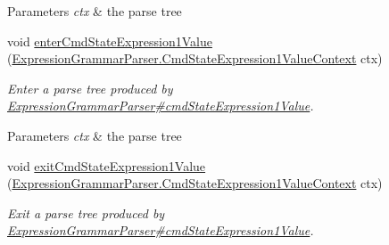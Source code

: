 \begin{DoxyCompactItemize}
\begin{DoxyCompactList}
\begin{DoxyParams}{Parameters}
{\em ctx} & the parse tree\\
\hline
\end{DoxyParams}
 \end{DoxyCompactList}\item 
void \hyperlink{classgov_1_1nasa_1_1jpf_1_1inspector_1_1server_1_1expression_1_1parser_1_1_expression_grammar_base_listener_ae7871ec829b2fa0f20377ad347fc954b}{enter\+Cmd\+State\+Expression1\+Value} (\hyperlink{classgov_1_1nasa_1_1jpf_1_1inspector_1_1server_1_1expression_1_1parser_1_1_expression_grammar_paacaa2424bb30d5b61478a2ac87dd697e}{Expression\+Grammar\+Parser.\+Cmd\+State\+Expression1\+Value\+Context} ctx)
\begin{DoxyCompactList}\small\item\em Enter a parse tree produced by \hyperlink{classgov_1_1nasa_1_1jpf_1_1inspector_1_1server_1_1expression_1_1parser_1_1_expression_grammar_parser_a3251ad238ec49a426731c88fd13886b1}{Expression\+Grammar\+Parser\#cmd\+State\+Expression1\+Value}.


\begin{DoxyParams}{Parameters}
{\em ctx} & the parse tree\\
\hline
\end{DoxyParams}
 \end{DoxyCompactList}\item 
void \hyperlink{classgov_1_1nasa_1_1jpf_1_1inspector_1_1server_1_1expression_1_1parser_1_1_expression_grammar_base_listener_a94796322d8d3a7ee94bc562103918d42}{exit\+Cmd\+State\+Expression1\+Value} (\hyperlink{classgov_1_1nasa_1_1jpf_1_1inspector_1_1server_1_1expression_1_1parser_1_1_expression_grammar_paacaa2424bb30d5b61478a2ac87dd697e}{Expression\+Grammar\+Parser.\+Cmd\+State\+Expression1\+Value\+Context} ctx)
\begin{DoxyCompactList}\small\item\em Exit a parse tree produced by \hyperlink{classgov_1_1nasa_1_1jpf_1_1inspector_1_1server_1_1expression_1_1parser_1_1_expression_grammar_parser_a3251ad238ec49a426731c88fd13886b1}{Expression\+Grammar\+Parser\#cmd\+State\+Expression1\+Value}.



\end{DoxyCompactList}
\end{DoxyCompactItemize}
